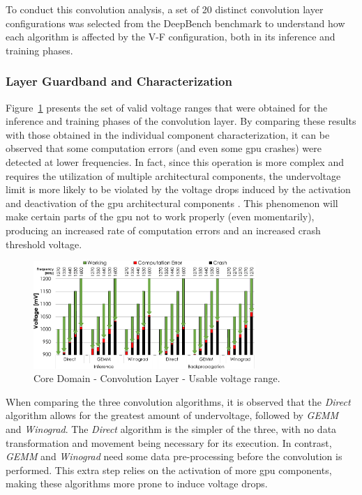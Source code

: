 To conduct this convolution analysis, a set of 20 distinct convolution layer configurations was selected from the DeepBench benchmark to understand how each algorithm is affected by the V-F configuration, both in its inference and training phases.



\subsubsection{Layer Guardband and Characterization}

Figure~\ref{fig:Convolution_guardband} presents the set of valid voltage ranges that were obtained for the inference and training phases of the convolution layer. By comparing these results with those obtained in the individual component characterization, it can be observed that some computation errors (and even some \acrshort{gpu} crashes) were detected at lower frequencies. In fact, since this operation is more complex and requires the utilization of multiple architectural components, the undervoltage limit is more likely to be violated by the voltage drops induced by the activation and deactivation of the \acrshort{gpu}  architectural components \cite{thomas_core_2016}. This phenomenon will make certain parts of the \acrshort{gpu} not to work properly (even momentarily), producing an increased rate of computation errors and an increased crash threshold voltage. 


\begin{figure}[htbp]
    \centering
        \includegraphics[width=0.75\textwidth]{Figures/Application To Deep Learning/Convolution_Guardband.pdf}
        \caption{Core Domain - Convolution Layer - Usable voltage range.}
    \label{fig:Convolution_guardband}
\end{figure}

When comparing the three convolution algorithms, it is observed that the \textit{Direct} algorithm allows for the greatest amount of undervoltage, followed by \textit{GEMM} and \textit{Winograd}. The \textit{Direct} algorithm is the simpler of the three, with no data transformation and movement being necessary for its execution. In contrast, \textit{GEMM} and \textit{Winograd} need some data pre-processing before the convolution is performed. This extra step relies on the activation of more \acrshort{gpu} components, making these algorithms more prone to induce voltage drops. 

